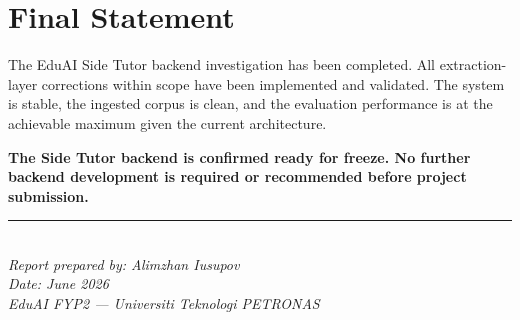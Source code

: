 \documentclass[12pt, a4paper]{report}
\begin{document}
\section{Final Statement}

The EduAI Side Tutor backend investigation has been completed. All
extraction-layer corrections within scope have been implemented and validated.
The system is stable, the ingested corpus is clean, and the evaluation
performance is at the achievable maximum given the current architecture.

\textbf{The Side Tutor backend is confirmed ready for freeze. No further
backend development is required or recommended before project submission.}

\vspace{1.5cm}
\noindent\rule{0.5\textwidth}{0.4pt}\\
\textit{Report prepared by: Alimzhan Iusupov}\\
\textit{Date: June 2026}\\
\textit{EduAI FYP2 — Universiti Teknologi PETRONAS}
\end{document}
